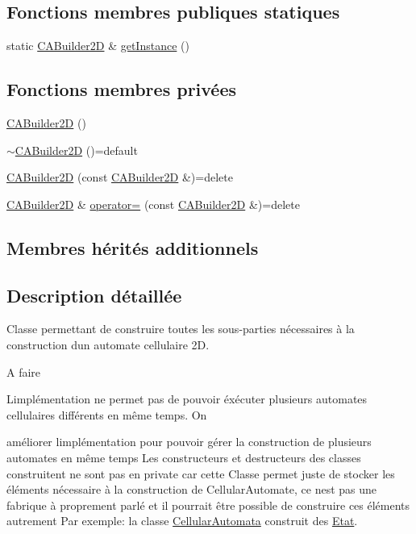 \subsection*{Fonctions membres publiques statiques}
\begin{DoxyCompactItemize}
\item 
static \mbox{\hyperlink{class_c_a_builder2_d}{C\+A\+Builder2D}} \& \mbox{\hyperlink{class_c_a_builder2_d_a013a50b0ebd4313516febd015db293c2}{get\+Instance}} ()
\end{DoxyCompactItemize}
\subsection*{Fonctions membres privées}
\begin{DoxyCompactItemize}
\item 
\mbox{\hyperlink{class_c_a_builder2_d_a208cc4460b17fb33756e0e384c173760}{C\+A\+Builder2D}} ()
\item 
\mbox{\hyperlink{class_c_a_builder2_d_a8f96127d2894b3a47fd32b8f23d073ba}{$\sim$\+C\+A\+Builder2D}} ()=default
\item 
\mbox{\hyperlink{class_c_a_builder2_d_a55cdd6483a571b716890d73ce4356c91}{C\+A\+Builder2D}} (const \mbox{\hyperlink{class_c_a_builder2_d}{C\+A\+Builder2D}} \&)=delete
\item 
\mbox{\hyperlink{class_c_a_builder2_d}{C\+A\+Builder2D}} \& \mbox{\hyperlink{class_c_a_builder2_d_aa21c22e1d8f10b05bad1b13988adf49d}{operator=}} (const \mbox{\hyperlink{class_c_a_builder2_d}{C\+A\+Builder2D}} \&)=delete
\end{DoxyCompactItemize}
\subsection*{Membres hérités additionnels}


\subsection{Description détaillée}
Classe permettant de construire toutes les sous-\/parties nécessaires à la construction d\textquotesingle{}un automate cellulaire 2D. 

\begin{DoxyRefDesc}{A faire}
\item[\mbox{\hyperlink{todo__todo000003}{A faire}}]L\textquotesingle{}implémentation ne permet pas de pouvoir éxécuter plusieurs automates cellulaires différents en même temps. On 

améliorer l\textquotesingle{}implémentation pour pouvoir gérer la construction de plusieurs automates en même temps Les constructeurs et destructeurs des classes construitent ne sont pas en private car cette Classe permet juste de stocker les éléments nécessaire à la construction de Cellular\+Automate, ce n\textquotesingle{}est pas une fabrique à proprement parlé et il pourrait être possible de construire ces éléments autrement Par exemple\+: la classe \mbox{\hyperlink{class_cellular_automata}{Cellular\+Automata}} construit des \mbox{\hyperlink{class_etat}{Etat}}.\end{DoxyRefDesc}


